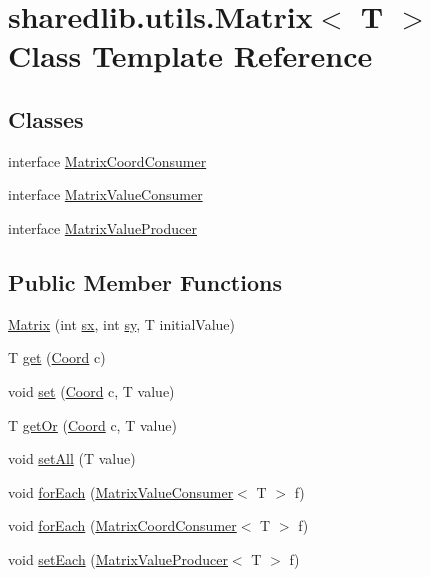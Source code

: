 \hypertarget{classsharedlib_1_1utils_1_1_matrix}{}\section{sharedlib.\+utils.\+Matrix$<$ T $>$ Class Template Reference}
\label{classsharedlib_1_1utils_1_1_matrix}
\subsection*{Classes}
\begin{DoxyCompactItemize}
\item 
interface \hyperlink{interfacesharedlib_1_1utils_1_1_matrix_1_1_matrix_coord_consumer}{Matrix\+Coord\+Consumer}
\item 
interface \hyperlink{interfacesharedlib_1_1utils_1_1_matrix_1_1_matrix_value_consumer}{Matrix\+Value\+Consumer}
\item 
interface \hyperlink{interfacesharedlib_1_1utils_1_1_matrix_1_1_matrix_value_producer}{Matrix\+Value\+Producer}
\end{DoxyCompactItemize}
\subsection*{Public Member Functions}
\begin{DoxyCompactItemize}
\item 
\hyperlink{classsharedlib_1_1utils_1_1_matrix_acaf0ae26880860dd079ee63620353fd1}{Matrix} (int \hyperlink{classsharedlib_1_1utils_1_1_matrix_afb6345b7525e7a0c51bd4f835248521b}{sx}, int \hyperlink{classsharedlib_1_1utils_1_1_matrix_a184f78d2081c890cd3b09a15b37ea28c}{sy}, T initial\+Value)
\item 
T \hyperlink{classsharedlib_1_1utils_1_1_matrix_a21c0d81f5f4bb563cd4dd71d8bd2b8a7}{get} (\hyperlink{classsharedlib_1_1utils_1_1_coord}{Coord} c)
\item 
void \hyperlink{classsharedlib_1_1utils_1_1_matrix_a7d0d0c02287d913332a739cbcdddde7e}{set} (\hyperlink{classsharedlib_1_1utils_1_1_coord}{Coord} c, T value)
\item 
T \hyperlink{classsharedlib_1_1utils_1_1_matrix_aca6a0e8ec5f4340706185ad79e1811df}{get\+Or} (\hyperlink{classsharedlib_1_1utils_1_1_coord}{Coord} c, T value)
\item 
void \hyperlink{classsharedlib_1_1utils_1_1_matrix_a19d3681f811fe3d54e926985b1e02ff4}{set\+All} (T value)
\item 
void \hyperlink{classsharedlib_1_1utils_1_1_matrix_a97de877e88587019e1a906c230a3b442}{for\+Each} (\hyperlink{interfacesharedlib_1_1utils_1_1_matrix_1_1_matrix_value_consumer}{Matrix\+Value\+Consumer}$<$ T $>$ f)
\item 
void \hyperlink{classsharedlib_1_1utils_1_1_matrix_af7b756b2f3962e615d7ddfb279c109b4}{for\+Each} (\hyperlink{interfacesharedlib_1_1utils_1_1_matrix_1_1_matrix_coord_consumer}{Matrix\+Coord\+Consumer}$<$ T $>$ f)
\item 
void \hyperlink{classsharedlib_1_1utils_1_1_matrix_aa503f540c218968d4660f2c601538316}{set\+Each} (\hyperlink{interfacesharedlib_1_1utils_1_1_matrix_1_1_matrix_value_producer}{Matrix\+Value\+Producer}$<$ T $>$ f)
\end{DoxyCompactItemize}
